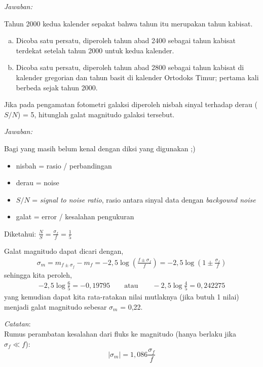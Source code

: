 \documentclass[11pt,fleqn]{exam}
\begin{document}
\begin{questions}
\textit{Jawaban: }

Tahun 2000 kedua kalender sepakat bahwa tahun itu merupakan tahun kabisat. 

\begin{enumerate}[a.]
	\item Dicoba satu persatu, diperoleh tahun abad 2400 sebagai tahun kabisat terdekat setelah tahun 2000 untuk kedua kalender.
	\item Dicoba satu persatu, diperoleh tahun abad 2800 sebagai tahun kabisat di kalender gregorian dan tahun basit di kalender Ortodoks Timur; pertama kali berbeda sejak tahun 2000.
\end{enumerate}



\vspace{0.5cm}
\question Jika pada pengamatan fotometri galaksi diperoleh nisbah sinyal terhadap derau ($S/N$) = 5, hitunglah galat magnitudo galaksi tersebut.


\textit{Jawaban: }

Bagi yang masih belum kenal dengan diksi yang digunakan ;)
\begin{itemize}
	\item nisbah = rasio / perbandingan
	\item derau = noise
	\item $S/N$ = \textit{signal to noise ratio}, rasio antara sinyal data dengan \textit{backgound noise}
	\item galat = error / kesalahan pengukuran
\end{itemize}

Diketahui: $ \frac{N}{S} = \frac{\sigma_f}{f} = \frac{1}{5}$

Galat magnitudo dapat dicari dengan,
\begin{eqnarray*}
\sigma_m = m_{f \pm \sigma_f} - m_f = -2,5 \log{\left(\frac{f \pm \sigma_f}{f}\right)} = -2,5 \log{\left(1 \pm \frac{\sigma_f}{f}\right)}
\end{eqnarray*}
sehingga kita peroleh,
\begin{eqnarray*}
	-2,5 \log{\frac{6}{5}} = -0,19795 \qquad \text{atau} \qquad -2,5 \log{\frac{4}{5}} = 0,242275
\end{eqnarray*}
yang kemudian dapat kita rata-ratakan nilai mutlaknya (jika butuh 1 nilai) menjadi galat magnitudo sebesar $\sigma_m$ = 0,22.

\textit{Catatan}:\\
Rumus perambatan kesalahan dari fluks ke magnitudo (hanya berlaku jika $\sigma_f \ll f$):
\begin{equation*}
\vert \sigma_m \vert = 1,086 \frac{\sigma_f}{f}
\end{equation*}



\end{questions}
\end{document}

